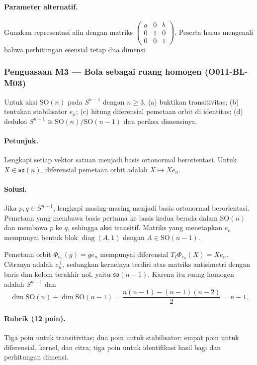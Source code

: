 \paragraph{Parameter alternatif.}
Gunakan representasi afin dengan matriks
$\left(\begin{smallmatrix}a&0&b\\0&1&0\\0&0&1\end{smallmatrix}\right)$.
Peserta harus mengenali bahwa perhitungan esensial tetap dua dimensi.

\subsubsection*{Penguasaan M3 — Bola sebagai ruang homogen (O011-BL-M03)}
\label{o011-bl-m03}

Untuk aksi $\mathrm{SO}(n)$ pada $S^{n-1}$ dengan $n\ge3$, (a) buktikan
transitivitas; (b) tentukan stabilisator $e_n$; (c) hitung diferensial pemetaan
orbit di identitas; (d) deduksi
$S^{n-1}\cong\mathrm{SO}(n)/\mathrm{SO}(n-1)$ dan periksa dimensinya.

\paragraph{Petunjuk.}
Lengkapi setiap vektor satuan menjadi basis ortonormal berorientasi. Untuk
$X\in\mathfrak{so}(n)$, diferensial pemetaan orbit adalah $X\mapsto Xe_n$.

\paragraph{Solusi.}
Jika $p,q\in S^{n-1}$, lengkapi masing-masing menjadi basis ortonormal
berorientasi. Pemetaan yang membawa basis pertama ke basis kedua berada dalam
$\mathrm{SO}(n)$ dan membawa $p$ ke $q$, sehingga aksi transitif. Matriks yang
menetapkan $e_n$ mempunyai bentuk blok
$\operatorname{diag}(A,1)$ dengan $A\in\mathrm{SO}(n-1)$.

Pemetaan orbit $\Phi_{e_n}(g)=ge_n$ mempunyai diferensial
$T_I\Phi_{e_n}(X)=Xe_n$. Citranya adalah $e_n^\perp$, sedangkan kernelnya
terdiri atas matriks antisimetri dengan baris dan kolom terakhir nol, yaitu
$\mathfrak{so}(n-1)$. Karena itu ruang homogen adalah $S^{n-1}$ dan
\[
 \dim\mathrm{SO}(n)-\dim\mathrm{SO}(n-1)
 =\frac{n(n-1)-(n-1)(n-2)}2=n-1.
\]

\paragraph{Rubrik (12 poin).}
Tiga poin untuk transitivitas; dua poin untuk stabilisator; empat poin untuk
diferensial, kernel, dan citra; tiga poin untuk identifikasi hasil bagi dan
perhitungan dimensi.

